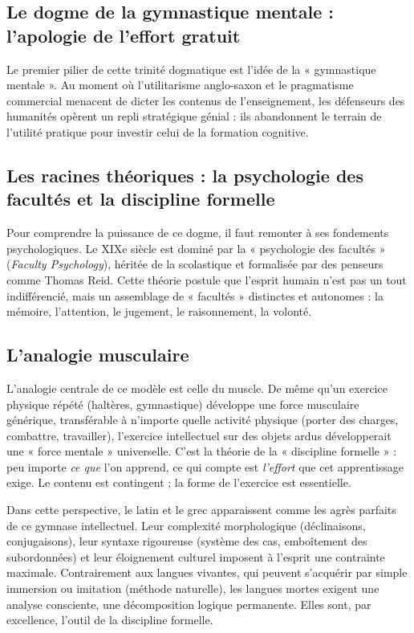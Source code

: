 \subsection{Le dogme de la gymnastique mentale : l'apologie de l'effort gratuit}

Le premier pilier de cette trinité dogmatique est l'idée de la « gymnastique mentale ». Au moment où
l'utilitarisme anglo-saxon et le pragmatisme commercial menacent de dicter les contenus de
l'enseignement, les défenseurs des humanités opèrent un repli stratégique génial : ils abandonnent
le terrain de l'utilité pratique pour investir celui de la formation cognitive.



\subsection{Les racines théoriques : la psychologie des facultés et la discipline formelle}

Pour comprendre la puissance de ce dogme, il faut remonter à ses fondements psychologiques. Le XIXe
siècle est dominé par la « psychologie des facultés » (\textit{Faculty Psychology}), héritée de la
scolastique et formalisée par des penseurs comme Thomas Reid.\cite{I-1-3-ref1} Cette théorie postule
que l'esprit humain n'est pas un tout indifférencié, mais un assemblage de « facultés » distinctes
et autonomes : la mémoire, l'attention, le jugement, le raisonnement, la volonté.



\subsection{L'analogie musculaire}

L'analogie centrale de ce modèle est celle du muscle. De même qu'un exercice physique répété
(haltères, gymnastique) développe une force musculaire générique, transférable à n'importe quelle
activité physique (porter des charges, combattre, travailler), l'exercice intellectuel sur des
objets ardus développerait une « force mentale » universelle.\cite{I-1-3-ref2} C'est la théorie de
la « discipline formelle » : peu importe \textit{ce que} l'on apprend, ce qui compte est
\textit{l'effort} que cet apprentissage exige. Le contenu est contingent ; la forme de l'exercice
est essentielle.

Dans cette perspective, le latin et le grec apparaissent comme les agrès parfaits de ce gymnase
intellectuel. Leur complexité morphologique (déclinaisons, conjugaisons), leur syntaxe rigoureuse
(système des cas, emboîtement des subordonnées) et leur éloignement culturel imposent à l'esprit une
contrainte maximale. Contrairement aux langues vivantes, qui peuvent s'acquérir par simple immersion
ou imitation (méthode naturelle), les langues mortes exigent une analyse consciente, une
décomposition logique permanente. Elles sont, par excellence, l'outil de la discipline
formelle.\cite{I-1-3-ref3}




